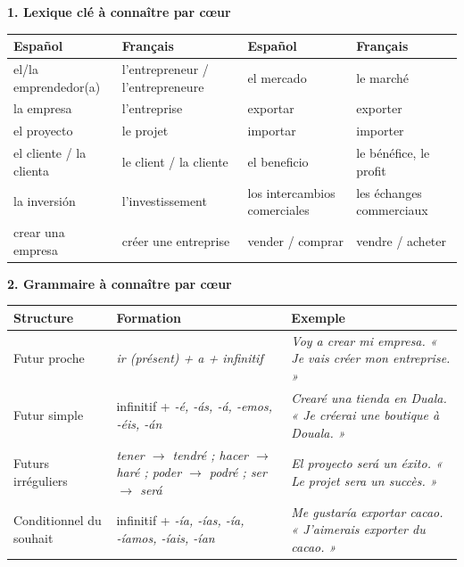 \documentclass[11pt]{article}
\newcommand{\esp}[1]{\ifmmode\text{\textit{#1}}\else\begingroup\selectlanguage{spanish}\itshape #1\endgroup\fi}
\begin{document}
\begin{aretenir}
\textbf{1. Lexique clé à connaître par cœur}

\begin{center}
\begin{tabularx}{\linewidth}{|X|X|X|X|}
\hline
\rowcolor{popblueL} \textbf{Español} & \textbf{Français} & \textbf{Español} & \textbf{Français} \\
\hline
el/la emprendedor(a) & l'entrepreneur / l'entrepreneure & el mercado & le marché \\
\hline
la empresa & l'entreprise & exportar & exporter \\
\hline
el proyecto & le projet & importar & importer \\
\hline
el cliente / la clienta & le client / la cliente & el beneficio & le bénéfice, le profit \\
\hline
la inversión & l'investissement & los intercambios comerciales & les échanges commerciaux \\
\hline
crear una empresa & créer une entreprise & vender / comprar & vendre / acheter \\
\hline
\end{tabularx}
\end{center}

\textbf{2. Grammaire à connaître par cœur}

\begin{center}
\begin{tabularx}{\linewidth}{|X|X|X|}
\hline
\rowcolor{popgreenL} \textbf{Structure} & \textbf{Formation} & \textbf{Exemple} \\
\hline
Futur proche & \esp{ir} (présent) + \esp{a} + infinitif & \esp{Voy a crear mi empresa.} « Je vais créer mon entreprise. » \\
\hline
Futur simple & infinitif + \esp{-é, -ás, -á, -emos, -éis, -án} & \esp{Crearé una tienda en Duala.} « Je créerai une boutique à Douala. » \\
\hline
Futurs irréguliers & \esp{tener $\to$ tendré} ; \esp{hacer $\to$ haré} ; \esp{poder $\to$ podré} ; \esp{ser $\to$ será} & \esp{El proyecto será un éxito.} « Le projet sera un succès. » \\
\hline
Conditionnel du souhait & infinitif + \esp{-ía, -ías, -ía, -íamos, -íais, -ían} & \esp{Me gustaría exportar cacao.} « J'aimerais exporter du cacao. » \\
\hline
\end{tabularx}
\end{center}


\end{aretenir}
\end{document}
